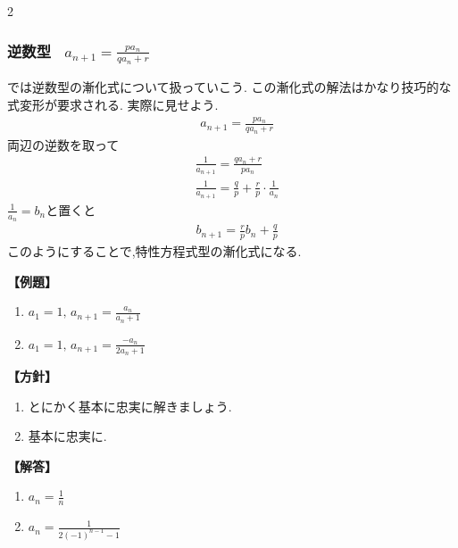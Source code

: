 \documentclass[dvipdfmx,a4paper,11pt,fleqn,openany]{jsbook}
\begin{document}
\begin{multicols*}{2}
    \subsubsection{逆数型  \, $\displaystyle a_{n+1}=\frac{pa_n}{qa_n+r}$}
      では逆数型の漸化式について扱っていこう.
      この漸化式の解法はかなり技巧的な式変形が要求される.
      実際に見せよう.
      \begin{align*}
        &a_{n+1}=\frac{pa_n}{qa_n+r}
      \end{align*}
        両辺の逆数を取って
      \begin{align*}
        &\frac{1}{a_{n+1}}=\frac{qa_n+r}{pa_n}\\
        &\frac{1}{a_{n+1}}=\frac{q}{p}+\frac{r}{p}\cdot\frac{1}{a_n}
      \end{align*}
      $\displaystyle \frac{1}{a_n}=b_n$と置くと
      \begin{align*}
        &b_{n+1}=\frac{r}{p}b_n+\frac{q}{p}
      \end{align*}
      このようにすることで,特性方程式型の漸化式になる.

      \noindent \textbf{【例題】}
      \begin{enumerate}[label=(\arabic*),parsep=3pt]
        \item $\displaystyle a_1=1,\, a_{n+1}=\frac{a_n}{a_n+1}$
        \item $\displaystyle a_1=1,\, a_{n+1}=\frac{-a_n}{2a_n+1}$
      \end{enumerate}

      \noindent\textbf{【方針】}
      \begin{enumerate}[label=(\arabic*),parsep=3pt]
        \item とにかく基本に忠実に解きましょう.
        \item 基本に忠実に.
      \end{enumerate}

      \noindent\textbf{【解答】}
      \begin{enumerate}[label=(\arabic*),parsep=3pt]
        \item $\displaystyle a_n=\frac{1}{n}$
        \item $\displaystyle a_n=\frac{1}{2(-1)^{n-1}-1}$
      \end{enumerate}


\end{multicols*}
\end{document}
